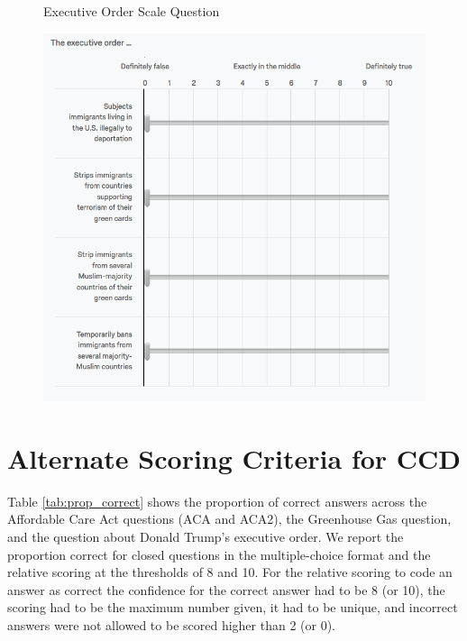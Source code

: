 \begin{center}
	\begin{figure}[H]
		\centering
		\caption{Executive Order Scale Question}
		\includegraphics[width=\textwidth]{../figs/hk_eo1.png}
		\label{fig:eo1}
		\caption*{\footnotesize }
	\end{figure}
\end{center}

\clearpage
\section{Alternate Scoring Criteria for CCD}

Table \ref{tab:prop_correct} shows the proportion of correct answers across the Affordable Care Act questions (ACA and ACA2), the Greenhouse Gas question, and the question about Donald Trump's executive order. We report the proportion correct for closed questions in the multiple-choice format and the relative scoring at the thresholds of 8 and 10. For the relative scoring to code an answer as correct the confidence for the correct answer had to be 8 (or 10), the scoring had to be the maximum number given, it had to be unique, and incorrect answers were not allowed to be scored higher than 2 (or 0). 



